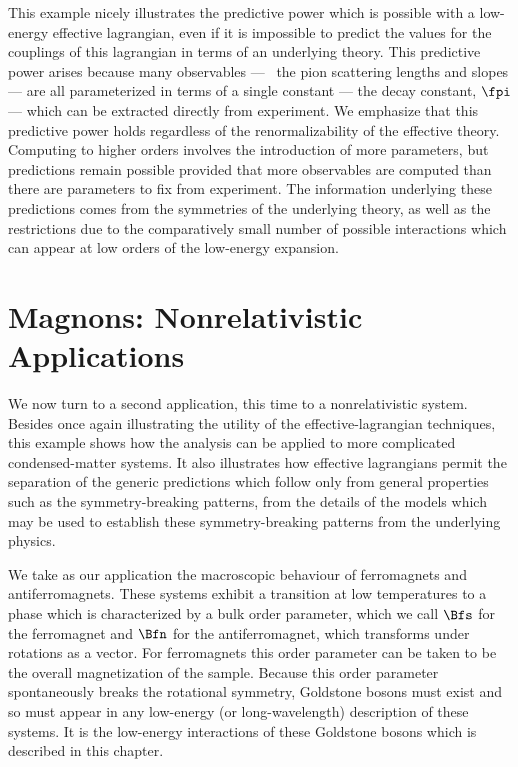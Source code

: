\documentclass[12pt]{report}
\begin{document}
This example nicely illustrates the predictive power which
is possible with a low-energy effective lagrangian, even if
it is impossible to predict the values for the couplings of
this lagrangian in terms of an underlying theory. This
predictive power arises because many observables --- \eg\
the pion scattering lengths and slopes --- are all
parameterized in terms of a single constant --- the decay
constant, $\fpi$ --- which can be extracted directly from
experiment. We emphasize that this predictive power holds
regardless of the renormalizability of the effective
theory. Computing to higher orders involves the
introduction of more parameters, but predictions remain
possible provided that more observables are computed than
there are parameters to fix from experiment. The
information underlying these predictions comes from the
symmetries of the underlying theory, as well as the
restrictions due to the comparatively small number of
possible interactions which can appear at low orders of the
low-energy expansion.

\chapter{Magnons: Nonrelativistic Applications}

We now turn to a second application, this time to a
nonrelativistic system. Besides once again illustrating the
utility of the effective-lagrangian techniques, this example
shows how the analysis can be applied to more complicated
condensed-matter systems. It also illustrates how effective
lagrangians permit the separation of the generic predictions
which follow only from general properties such as the
symmetry-breaking patterns, from the details of the models
which may be used to establish these symmetry-breaking
patterns from the underlying physics.

We take as our application the macroscopic behaviour of
ferromagnets and antiferromagnets. These systems exhibit a
transition at low temperatures to a phase which is
characterized by a bulk order parameter, which we call
$\Bfs$ for the ferromagnet and $\Bfn$ for the
antiferromagnet, which transforms under rotations as a
vector. For ferromagnets this order parameter can be taken
to be the overall magnetization of the sample. Because this
order parameter spontaneously breaks the rotational
symmetry, Goldstone bosons must exist and so must appear in
any low-energy (or long-wavelength) description of these
systems. It is the low-energy interactions of these
Goldstone bosons which is described in this chapter.
\end{document}
